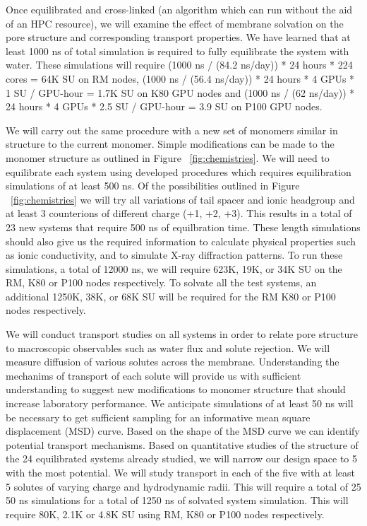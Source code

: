 Once equilibrated and cross-linked (an algorithm which can run without the 
aid of an HPC resource), we will examine the effect of membrane
solvation on the pore structure and corresponding transport properties.
We have learned that at least 1000 ns of total simulation is required
to fully equilibrate the system with water. These simulations will require
(1000 ns / (84.2 ns/day)) * 24 hours * 224 cores = 64K SU on RM nodes, 
(1000 ns / (56.4 ns/day)) * 24 hours * 4 GPUs * 1 SU / GPU-hour = 1.7K SU on K80 GPU nodes and
(1000 ns / (62 ns/day)) * 24 hours * 4 GPUs * 2.5 SU / GPU-hour = 3.9 SU on P100 GPU nodes. 

We will carry out the same procedure with a new set of monomers similar
in structure to the current monomer. Simple modifications can be made
to the monomer structure as outlined in Figure ~\ref{fig:chemistries}. 
We will need to equilibrate each system using developed procedures which
requires equilibration simulations of at least 500 ns. Of the 
possibilities outlined in Figure ~\ref{fig:chemistries} we will try all
variations of tail spacer and ionic headgroup and at least 3 counterions
of different charge (+1, +2, +3). This results in a total of 23 new systems 
that require 500 ns of equilbration time. These length simulations should
also give us the required information to calculate physical properties 
such as ionic conductivity, and to simulate X-ray diffraction patterns.
To run these simulations, a total of 12000 ns, we will require 623K, 19K, 
or 34K SU on the RM, K80 or P100 nodes respectively. To solvate all the test
systems, an additional 1250K, 38K, or 68K SU will be required for the RM
K80 or P100 nodes respectively.

We will conduct transport studies on all systems in order to relate pore
structure to macroscopic observables such as water flux and solute
rejection. We will measure diffusion of various solutes across the 
membrane. Understanding the mechanims of transport of each solute will
provide us with sufficient understanding to suggest new modifications 
to monomer structure that should increase laboratory performance. We
anticipate simulations of at least 50 ns will be necessary to get 
sufficient sampling for an informative mean square displacement (MSD) 
curve. Based on the shape of the MSD curve we can identify potential 
transport mechanisms. Based on quantitative studies of the structure
of the 24 equilibrated systems already studied, we will narrow our 
design space to 5 with the most potential. We will study transport in %
each of the five with at least 5 solutes of varying charge and 
hydrodynamic radii. This will require a total of 25 50 ns simulations for
a total of 1250 ns of solvated system simulation. This will require
80K, 2.1K or 4.8K SU using RM, K80 or P100 nodes respectively.   


